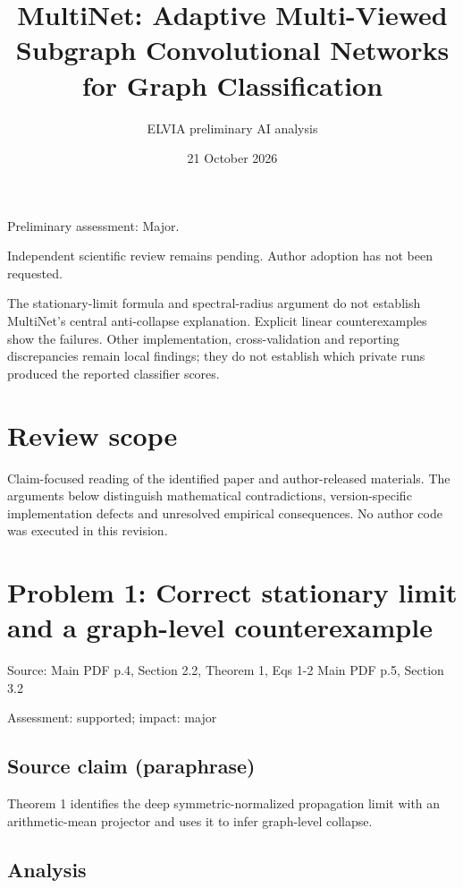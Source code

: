 \documentclass[11pt]{article}
\begin{document}
\title{MultiNet: Adaptive Multi-Viewed Subgraph Convolutional Networks for Graph Classification}

\author{ELVIA preliminary AI analysis}\date{21 October 2026}\maketitle

Preliminary assessment: Major.\par

Independent scientific review remains pending. Author adoption has not been requested.

The stationary-limit formula and spectral-radius argument do not establish MultiNet's central anti-collapse explanation. Explicit linear counterexamples show the failures. Other implementation, cross-validation and reporting discrepancies remain local findings; they do not establish which private runs produced the reported classifier scores.

\section*{Review scope}

Claim-focused reading of the identified paper and author-released materials. The arguments below distinguish mathematical contradictions, version-specific implementation defects and unresolved empirical consequences. No author code was executed in this revision.

\section*{Problem 1: Correct stationary limit and a graph-level counterexample}

Source: Main PDF p.4, Section 2.2, Theorem 1, Eqs 1-2 Main PDF p.5, Section 3.2

Assessment: supported; impact: major

\subsection*{Source claim (paraphrase)}

Theorem 1 identifies the deep symmetric-normalized propagation limit with an arithmetic-mean projector and uses it to infer graph-level collapse.

\subsection*{Analysis}
\end{document}
